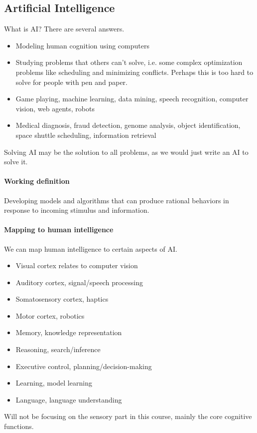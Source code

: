 \documentclass[12 pt]{article}
\begin{document}
        \subsection{Artificial Intelligence}
            What is AI? There are several answers.
            \begin{itemize}
            \item Modeling human cognition using computers
            \item Studying problems that others can't solve, i.e. some
              complex optimization problems like scheduling and
              minimizing conflicts. Perhaps this is too hard to solve
              for people with pen and paper.
            \item Game playing, machine learning, data mining, speech
              recognition, computer vision, web agents, robots
            \item Medical diagnosis, fraud detection, genome analysis,
              object identification, space shuttle scheduling,
              information retrieval
            \end{itemize}
            Solving AI may be the solution to all problems, as we
            would just write an AI to solve it.
            \paragraph{Working definition} Developing models and
            algorithms that can produce rational behaviors in response
            to incoming stimulus and information.
            \paragraph{Mapping to human intelligence} We can map human
            intelligence to certain aspects of AI.
            \begin{itemize}
            \item Visual cortex relates to computer vision
            \item Auditory cortex, signal/speech processing
            \item Somatosensory cortex, haptics
            \item Motor cortex, robotics
            \item Memory, knowledge representation
            \item Reasoning, search/inference
            \item Executive control, planning/decision-making
            \item Learning, model learning
            \item Language, language understanding
            \end{itemize}
            Will not be focusing on the sensory part in this course,
            mainly the core cognitive functions.
\end{document}
